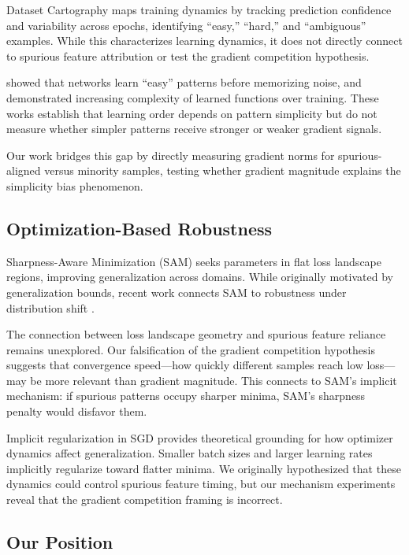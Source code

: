 Dataset Cartography \citep{swayamdipta2020dataset} maps training dynamics by tracking prediction confidence and variability across epochs, identifying ``easy,'' ``hard,'' and ``ambiguous'' examples. While this characterizes learning dynamics, it does not directly connect to spurious feature attribution or test the gradient competition hypothesis.

\citet{arpit2017closer} showed that networks learn ``easy'' patterns before memorizing noise, and \citet{kalimeris2019sgd} demonstrated increasing complexity of learned functions over training. These works establish that learning order depends on pattern simplicity but do not measure whether simpler patterns receive stronger or weaker gradient signals.

Our work bridges this gap by directly measuring gradient norms for spurious-aligned versus minority samples, testing whether gradient magnitude explains the simplicity bias phenomenon.

\subsection{Optimization-Based Robustness}

Sharpness-Aware Minimization (SAM) \citep{Foret2021Sharpness} seeks parameters in flat loss landscape regions, improving generalization across domains. While originally motivated by generalization bounds, recent work connects SAM to robustness under distribution shift \citep{bahri2022sharpness}.

The connection between loss landscape geometry and spurious feature reliance remains unexplored. Our falsification of the gradient competition hypothesis suggests that convergence speed---how quickly different samples reach low loss---may be more relevant than gradient magnitude. This connects to SAM's implicit mechanism: if spurious patterns occupy sharper minima, SAM's sharpness penalty would disfavor them.

Implicit regularization in SGD \citep{smith2018bayesian,barrett2021implicit} provides theoretical grounding for how optimizer dynamics affect generalization. Smaller batch sizes and larger learning rates implicitly regularize toward flatter minima. We originally hypothesized that these dynamics could control spurious feature timing, but our mechanism experiments reveal that the gradient competition framing is incorrect.

\subsection{Our Position}

